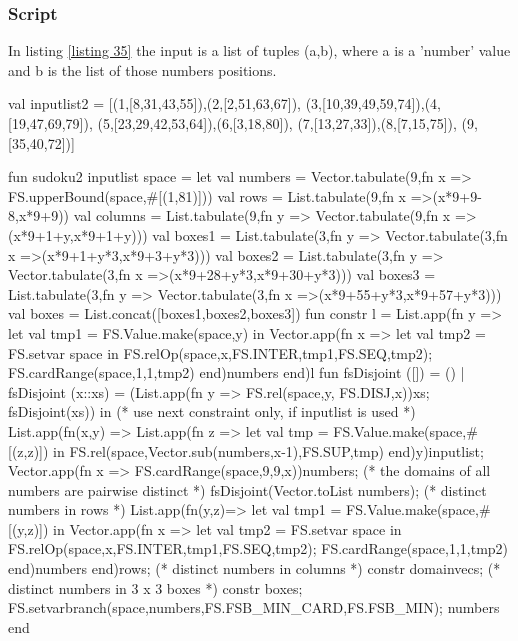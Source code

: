 \documentclass[a4paper]{scrartcl}
\begin{document}
\subsubsection{Script}
In listing \ref{listing 35} the input is a list of tuples
(a,b), where a is a 'number' value and b is the list of those
numbers positions. 
\begin{myverbatim}
val inputlist2 = [(1,[8,31,43,55]),(2,[2,51,63,67]),
                  (3,[10,39,49,59,74]),(4,[19,47,69,79]),
                  (5,[23,29,42,53,64]),(6,[3,18,80]),
                  (7,[13,27,33]),(8,[7,15,75]),
                  (9,[35,40,72])]

fun sudoku2 inputlist space = 
  let
     val numbers = Vector.tabulate(9,fn x => 
                        FS.upperBound(space,#[(1,81)]))
     val rows = List.tabulate(9,fn x =>(x*9+9-8,x*9+9)) 
     val columns = List.tabulate(9,fn y => 
                       Vector.tabulate(9,fn x =>(x*9+1+y,x*9+1+y)))
     val boxes1 = List.tabulate(3,fn y => 
                   Vector.tabulate(3,fn x =>(x*9+1+y*3,x*9+3+y*3)))
     val boxes2 = List.tabulate(3,fn y => 
                   Vector.tabulate(3,fn x =>(x*9+28+y*3,x*9+30+y*3)))
     val boxes3 = List.tabulate(3,fn y => 
                   Vector.tabulate(3,fn x =>(x*9+55+y*3,x*9+57+y*3)))
     val boxes = List.concat([boxes1,boxes2,boxes3])
     fun constr l = 
       List.app(fn y => 
                 let
                    val tmp1 = FS.Value.make(space,y)
                 in
                    Vector.app(fn x => 
                     let 
                        val tmp2 = FS.setvar space 
                     in
                        FS.relOp(space,x,FS.INTER,tmp1,FS.SEQ,tmp2);
                        FS.cardRange(space,1,1,tmp2)
                     end)numbers
                 end)l
     fun fsDisjoint ([]) = ()
       | fsDisjoint (x::xs) = 
            (List.app(fn y => FS.rel(space,y, FS.DISJ,x))xs;
             fsDisjoint(xs))
  in
    (* use next constraint only, if inputlist is used *)
     List.app(fn(x,y) => 
       List.app(fn z => 
                  let 
                     val tmp = FS.Value.make(space,#[(z,z)])
                  in
                     FS.rel(space,Vector.sub(numbers,x-1),FS.SUP,tmp)
                  end)y)inputlist;
     Vector.app(fn x => FS.cardRange(space,9,9,x))numbers;
    (* the domains of all numbers are pairwise distinct *)
     fsDisjoint(Vector.toList numbers);
    (* distinct numbers in rows *)
     List.app(fn(y,z)=>
       let 
          val tmp1 = FS.Value.make(space,#[(y,z)]) 
       in
          Vector.app(fn x => 
                      let 
                         val tmp2 = FS.setvar space 
                      in
                         FS.relOp(space,x,FS.INTER,tmp1,FS.SEQ,tmp2);
                         FS.cardRange(space,1,1,tmp2)
                      end)numbers
       end)rows;
    (* distinct numbers in columns *)
     constr domainvecs;  
    (* distinct numbers in 3 x 3 boxes *)
     constr boxes;   
     FS.setvarbranch(space,numbers,FS.FSB_MIN_CARD,FS.FSB_MIN); 
     numbers
  end
\end{myverbatim}
\end{document}
